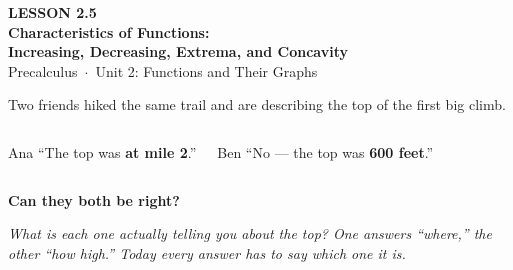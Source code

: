 \documentclass[aspectratio=169, 11pt]{beamer}
\begin{document}
{
\begin{frame}[plain]
  \vspace{2.6cm}\hspace{0.55cm}%
  \begin{minipage}{0.9\textwidth}
    {\color{goldacc}\bfseries\small LESSON 2.5}\\[0.5cm]
    {\color{white}\bfseries\Large Characteristics of Functions:}\\[0.2cm]
    {\color{white}\bfseries\Large Increasing, Decreasing, Extrema, and Concavity}\\[1.0cm]
    {\color{lilacmid}\small Precalculus~$\cdot$~Unit 2: Functions and Their Graphs}
  \end{minipage}
\end{frame}
}

\begin{frame}[t, plain]

  Two friends hiked the same trail and are describing the top of the first big climb.

  \bigskip
  \begin{columns}[T]
      \begin{block}{Ana}
        ``The top was \textbf{at mile 2}.''
      \end{block}
      \begin{block}{Ben}
        ``No --- the top was \textbf{600 feet}.''
      \end{block}
  \end{columns}

  \bigskip
  \begin{center}
    {\Large\bfseries\color{plum} Can they both be right?}
  \end{center}

  \medskip
  \textit{What is each one actually telling you about the top? One answers ``where,'' the
  other ``how high.'' Today every answer has to say which one it is.}
\end{frame}
\end{document}
